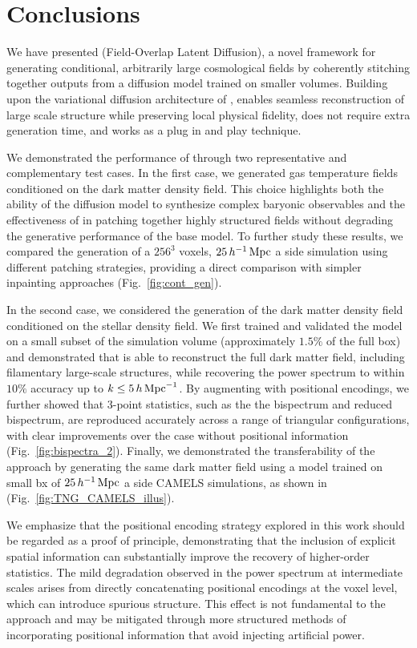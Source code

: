 \section{Conclusions}
\label{sec:conclusions}
We have presented \FOLD (Field-Overlap Latent Diffusion), a novel framework for generating conditional, arbitrarily large cosmological fields by coherently stitching together outputs from a diffusion model trained on smaller volumes. Building upon the variational diffusion architecture of \LODI, \FOLD enables seamless reconstruction of large scale structure while preserving local physical fidelity, does not require extra generation time, and works as a plug in and play technique.

We demonstrated the performance of \FOLD through two representative and complementary test cases. In the first case, we generated gas temperature fields conditioned on the dark matter density field. This choice highlights both the ability of the diffusion model to synthesize complex baryonic observables and the effectiveness of \FOLD in patching together highly
structured fields without degrading the generative performance of the base model. To further study these results, we compared the generation of a
$256^3$ voxels, $25\,h^{-1}\,\mathrm{Mpc}$ a side \CAMELS simulation using different patching strategies, providing
a direct comparison with simpler inpainting approaches
(Fig.~\ref{fig:cont_gen}).


In the second case, we considered the generation of the \TNG dark matter density field conditioned on the stellar density field. We first trained and validated
the model on a small subset of the simulation volume (approximately $1.5\%$ of the full \TNG box) and demonstrated that \FOLD is able to reconstruct the full
dark matter field, including filamentary large-scale structures, while recovering the power spectrum to within $10\%$ accuracy up to $k \leq 5\,h\,\mathrm{Mpc}^{-1}$. By augmenting \FOLD with positional encodings, we further showed that 3-point statistics, such as the the bispectrum and reduced bispectrum, are reproduced accurately across a range of triangular configurations, with clear improvements over the case without positional information (Fig.~\ref{fig:bispectra_2}). Finally, we demonstrated the transferability of the approach by generating the same \TNG dark matter field
using a model trained on small bx of $25\,h^{-1}\,\mathrm{Mpc}$ a side CAMELS simulations, as shown in (Fig.~\ref{fig:TNG_CAMELS_illus}).



We emphasize that the positional encoding strategy explored in this work should be regarded as a proof of principle, demonstrating that the inclusion of explicit spatial information can substantially improve the recovery of higher-order statistics. The mild degradation observed in the power spectrum at intermediate scales arises from directly concatenating positional encodings at the voxel level, which can introduce spurious structure. This effect is not fundamental to the approach and may be mitigated through
more structured methods of incorporating positional information that avoid injecting artificial power.


